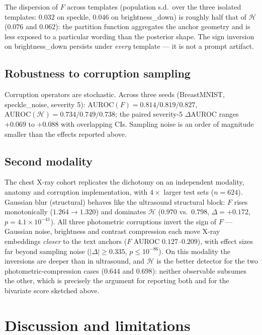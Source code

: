 \documentclass[11pt]{article}
\newcommand{\Hent}{\mathcal{H}}
\begin{document}
The dispersion of $F$ across templates (population s.d.\ over the three
isolated templates: $0.032$ on speckle, $0.046$ on brightness\_down) is roughly
half that of $\Hent$ ($0.076$ and $0.062$): the
partition function aggregates the anchor geometry and is less exposed to a
particular wording than the posterior shape. The sign inversion on
brightness\_down persists under \emph{every} template --- it is not a prompt
artifact.

\subsection{Robustness to corruption sampling}

Corruption operators are stochastic. Across three seeds (BreastMNIST,
speckle\_noise, severity 5): $\mathrm{AUROC}(F) = 0.814/0.819/0.827$,
$\mathrm{AUROC}(\Hent) = 0.734/0.749/0.738$; the paired severity-5
$\Delta$AUROC ranges $+0.069$ to $+0.088$ with overlapping CIs. Sampling noise
is an order of magnitude smaller than the effects reported above.

\subsection{Second modality}
\label{sec:pneumonia}

The chest X-ray cohort replicates the dichotomy on an independent modality,
anatomy and corruption implementation, with $4\times$ larger test sets
($n=624$). Gaussian blur (structural) behaves like the ultrasound structural
block: $F$ rises monotonically ($1.264\!\to\!1.320$) and dominates $\Hent$
($0.970$ vs.\ $0.798$, $\Delta=+0.172$, $p=4.1\times10^{-41}$). All three
photometric corruptions invert the sign of $F$ --- Gaussian noise, brightness
and contrast compression each move X-ray embeddings \emph{closer} to the text
anchors ($F$ AUROC $0.127$--$0.209$), with effect sizes far beyond sampling
noise ($|\Delta|\ge 0.335$, $p\le 10^{-86}$). On this modality the inversions
are deeper than in ultrasound, and $\Hent$ is the better detector for the two
photometric-compression cases ($0.644$ and $0.698$): neither observable
subsumes the other, which is precisely the argument for reporting both and for
the bivariate score sketched above.

\section{Discussion and limitations}
\label{sec:discussion}
\end{document}
